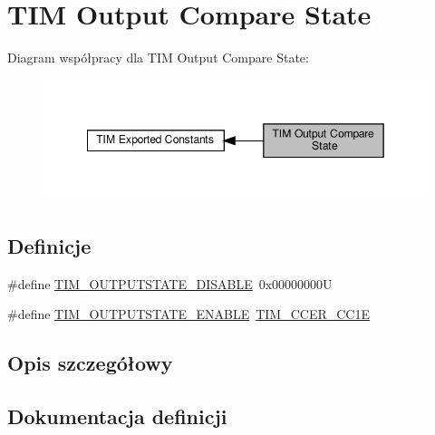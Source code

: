 \hypertarget{group___t_i_m___output___compare___state}{}\section{T\+IM Output Compare State}
\label{group___t_i_m___output___compare___state}
Diagram współpracy dla T\+IM Output Compare State\+:\nopagebreak
\begin{figure}[H]
\begin{center}
\leavevmode
\includegraphics[width=349pt]{group___t_i_m___output___compare___state}
\end{center}
\end{figure}
\subsection*{Definicje}
\begin{DoxyCompactItemize}
\item 
\#define \hyperlink{group___t_i_m___output___compare___state_ga98fa585adffeb0d3654b47040576c6b7}{T\+I\+M\+\_\+\+O\+U\+T\+P\+U\+T\+S\+T\+A\+T\+E\+\_\+\+D\+I\+S\+A\+B\+LE}~0x00000000U
\item 
\#define \hyperlink{group___t_i_m___output___compare___state_ga114555abc521311f689478a7e0a9ace9}{T\+I\+M\+\_\+\+O\+U\+T\+P\+U\+T\+S\+T\+A\+T\+E\+\_\+\+E\+N\+A\+B\+LE}~\hyperlink{group___peripheral___registers___bits___definition_ga3f494b9881e7b97bb2d79f7ad4e79937}{T\+I\+M\+\_\+\+C\+C\+E\+R\+\_\+\+C\+C1E}
\end{DoxyCompactItemize}


\subsection{Opis szczegółowy}


\subsection{Dokumentacja definicji}
\mbox{\label{group___t_i_m___output___compare___state_ga98fa585adffeb0d3654b47040576c6b7}} 
